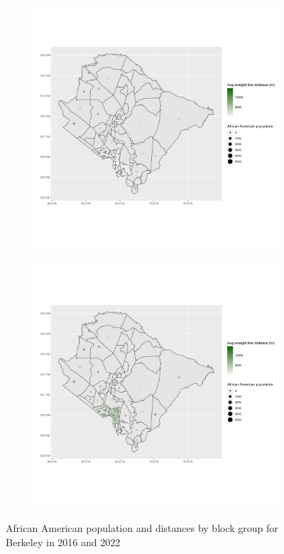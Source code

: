 \documentclass[11pt]{article}
\theoremstyle{remark}
\theoremstyle{definition}
\begin{document}
\begin{figure}
	\begin{subfigure}{.5\textwidth}
		\centering
		\includegraphics[width=\linewidth]{result analysis/Berkeley_SC_original_configs/black_pop_and_dist_Berkeley_config_original_2016_polls.png}
		\label{sfig:York_2016_bg_dist_pop}
	\end{subfigure} 
	\begin{subfigure}{.5\textwidth}
		\centering
		\includegraphics[width=\linewidth]{result analysis/Berkeley_SC_original_configs/black_pop_and_dist_Berkeley_config_original_2022_polls.png}
		\label{sfig:Berkeley_2022_bg_dist}
	\end{subfigure}
	\caption{African American population and distances by block group for Berkeley in 2016 and 2022}
	\label{fig:Berkeley distance Black population maps}
\end{figure}
\end{document}
